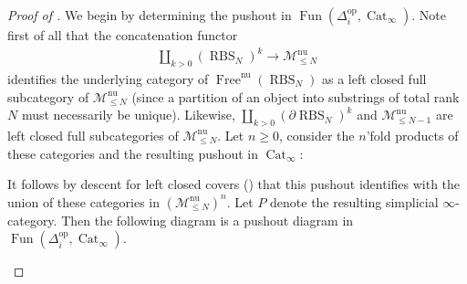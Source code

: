 \documentclass[12pt, reqno]{amsart}
\theoremstyle{plain}
\theoremstyle{definition}
\begin{document}
\begin{proof}[Proof of ]
We begin by determining the pushout in $\operatorname{Fun}(\Delta^{\operatorname{op}}_i, \operatorname{Cat}_\infty)$.
Note first of all that the concatenation functor
\begin{align*}
\coprod_{k>0}(\operatorname{RBS}_N)^k\rightarrow \mathscr{M}_{\leq N}^{\operatorname{nu}}
\end{align*}
identifies the underlying category of $\operatorname{Free}^{\operatorname{nu}}(\operatorname{RBS}_N)$ as a left closed full subcategory of $\mathscr{M}_{\leq N}^{\operatorname{nu}}$ (since a partition of an object into substrings of total rank $N$ must necessarily be unique). Likewise, $\coprod_{k> 0}(\partial\operatorname{RBS}_N)^k$ and $\mathscr{M}_{\leq N-1}^{\operatorname{nu}}$ are left closed full subcategories of $\mathscr{M}_{\leq N}^{\operatorname{nu}}$. Let $n\geq 0$, consider the $n$'fold products of these categories and the resulting pushout in $\operatorname{Cat}_\infty$:
\begin{center}
\end{center}
It follows by descent for left closed covers (\cite[Corollary 2.33]{ClausenOrsnesJansen}) that this pushout identifies with the union of these categories in $(\mathscr{M}_{\leq N}^{\operatorname{nu}})^n$. Let $P$ denote the resulting simplicial $\infty$-category. Then the following diagram is a pushout diagram in $\operatorname{Fun}(\Delta^{\operatorname{op}}_i, \operatorname{Cat}_\infty)$.
\begin{center}
\end{center}


\end{proof}
\end{document}
